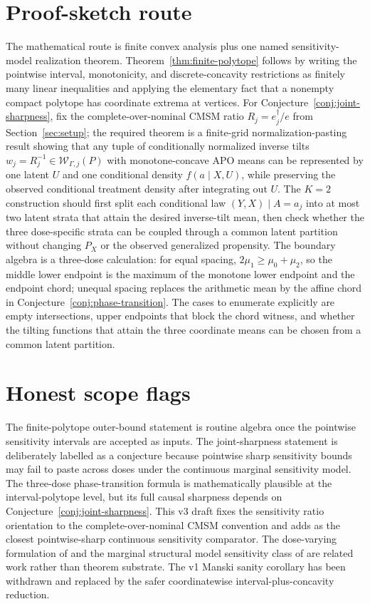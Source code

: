 \documentclass[11pt]{article}
\theoremstyle{definition}
\theoremstyle{plain}
\theoremstyle{remark}
\begin{document}
\section{Proof-sketch route}
The mathematical route is finite convex analysis plus one named sensitivity-model realization theorem.  Theorem~\ref{thm:finite-polytope} follows by writing the pointwise interval, monotonicity, and discrete-concavity restrictions as finitely many linear inequalities and applying the elementary fact that a nonempty compact polytope has coordinate extrema at vertices.  For Conjecture~\ref{conj:joint-sharpness}, fix the complete-over-nominal CMSM ratio \(R_j=e^\dagger_j/e\) from Section~\ref{sec:setup}; the required theorem is a finite-grid normalization-pasting result showing that any tuple of conditionally normalized inverse tilts \(w_j=R_j^{-1}\in\mathcal W_{\Gamma,j}(P)\) with monotone-concave APO means can be represented by one latent \(U\) and one conditional density \(f(a\mid X,U)\), while preserving the observed conditional treatment density after integrating out \(U\).  The \(K=2\) construction should first split each conditional law \((Y,X)\mid A=a_j\) into at most two latent strata that attain the desired inverse-tilt mean, then check whether the three dose-specific strata can be coupled through a common latent partition without changing \(P_X\) or the observed generalized propensity.  The boundary algebra is a three-dose calculation: for equal spacing, \(2\mu_1\ge\mu_0+\mu_2\), so the middle lower endpoint is the maximum of the monotone lower endpoint and the endpoint chord; unequal spacing replaces the arithmetic mean by the affine chord in Conjecture~\ref{conj:phase-transition}.  The cases to enumerate explicitly are empty intersections, upper endpoints that block the chord witness, and whether the tilting functions that attain the three coordinate means can be chosen from a common latent partition.

\section{Honest scope flags}
The finite-polytope outer-bound statement is routine algebra once the pointwise sensitivity intervals are accepted as inputs.  The joint-sharpness statement is deliberately labelled as a conjecture because pointwise sharp sensitivity bounds may fail to paste across doses under the continuous marginal sensitivity model.  The three-dose phase-transition formula is mathematically plausible at the interval-polytope level, but its full causal sharpness depends on Conjecture~\ref{conj:joint-sharpness}.  This v3 draft fixes the sensitivity ratio orientation to the complete-over-nominal CMSM convention and adds \citet{BaitairianSebastienJreichKatsahianGuilloux2025} as the closest pointwise-sharp continuous sensitivity comparator.  The dose-varying formulation of \citet{DalalTchetgenTchetgen2025} and the marginal structural model sensitivity class of \citet{BonviniKennedyVenturaWasserman2022} are related work rather than theorem substrate.  The v1 Manski sanity corollary has been withdrawn and replaced by the safer coordinatewise interval-plus-concavity reduction.
\end{document}
